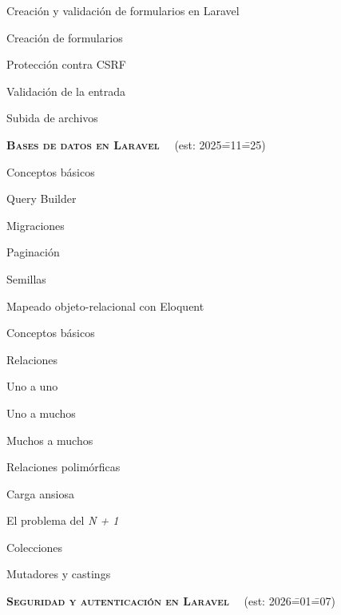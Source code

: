 \begin{longenum}
\begin{longenum}
        \item Creación y validación de formularios en Laravel
        \begin{longenum}
            \item Creación de formularios
            \item Protección contra CSRF
            \item Validación de la entrada
            \item Subida de archivos
        \end{longenum}
    \end{longenum}
    \item \textbf{\textsc{Bases de datos en Laravel}} \ \ (est: 2025\==11\==25)
    \begin{longenum}
        \item Conceptos básicos
        \item Query Builder
        \item Migraciones
        \item Paginación
        \item Semillas
        \item Mapeado objeto-relacional con Eloquent
        \begin{longenum}
            \item Conceptos básicos
            \item Relaciones
            \begin{longenum}
                \item Uno a uno
                \item Uno a muchos
                \item Muchos a muchos
                \item Relaciones polimórficas
                \item Carga ansiosa
                \begin{longenum}
                    \item El problema del \textit{N + 1}
                \end{longenum}
            \end{longenum}
            \item Colecciones
            \item Mutadores y castings
        \end{longenum}
    \end{longenum}
    \item \textbf{\textsc{Seguridad y autenticación en Laravel}} \ \ (est: 2026\==01\==07)

\end{longenum}
